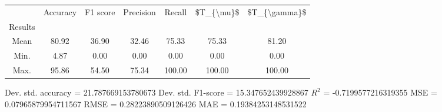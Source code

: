 \begin{tabular}{|c|c|c|c|c|c|c|}
\toprule
{} &  Accuracy &  F1 score &  Precision &  Recall &  \$T\_\{\textbackslash mu\}\$ &  \$T\_\{\textbackslash gamma\}\$ \\
Results &           &           &            &         &            &               \\
\hline
Mean    &     80.92 &     36.90 &      32.46 &   75.33 &      75.33 &         81.20 \\
Min.    &      4.87 &      0.00 &       0.00 &    0.00 &       0.00 &          0.00 \\
Max.    &     95.86 &     54.50 &      75.34 &  100.00 &     100.00 &        100.00 \\
\bottomrule
\end{tabular}

 Dev. std. accuracy = 21.787669153780673
 Dev. std. F1-score = 15.347652439928867
 $R^2$ = -0.7199577216319355
 MSE = 0.07965879954711567
 RMSE = 0.28223890509126426
 MAE = 0.19384253148531522